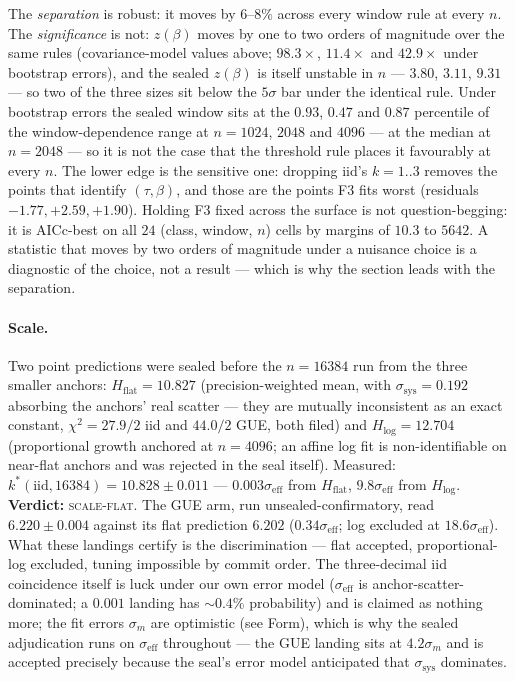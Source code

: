 \documentclass[11pt]{article}
\newcommand{\kstar}{k^{*}}
\newcommand{\seff}{\sigma_{\mathrm{eff}}}
\newcommand{\ssys}{\sigma_{\mathrm{sys}}}
\newcommand{\verdict}[1]{\textsc{#1}}
\begin{document}
\noindent
The \emph{separation} is robust: it moves by $6$--$8\%$ across every window rule at every $n$.
The \emph{significance} is not: $z(\beta)$ moves by one to two orders of magnitude over the
same rules (covariance-model values above; $98.3\times$, $11.4\times$ and $42.9\times$ under
bootstrap errors), and the sealed $z(\beta)$ is itself unstable in $n$ --- $3.80$, $3.11$,
$9.31$ --- so two of the three sizes sit below the $5\sigma$ bar under the identical rule.
Under bootstrap errors the sealed window sits at the $0.93$, $0.47$ and $0.87$ percentile of the
window-dependence range at $n=1024$, $2048$ and $4096$ --- at the median at $n=2048$ --- so it
is not the case that the threshold rule places it favourably at every $n$. The lower edge is
the sensitive one: dropping iid's $k=1..3$ removes the points that identify $(\tau,\beta)$, and
those are the points F3 fits worst (residuals $-1.77,+2.59,+1.90$). Holding F3 fixed across the
surface is not question-begging: it is AICc-best on all $24$ (class, window, $n$) cells by
margins of $10.3$ to $5642$. A statistic that moves by two orders of magnitude under a
nuisance choice is a diagnostic of the choice, not a result --- which is why the section leads
with the separation.

\paragraph{Scale.} Two point predictions were sealed before the $n=16384$ run from the three
smaller anchors: $H_{\mathrm{flat}}=10.827$ (precision-weighted mean, with $\ssys=0.192$
absorbing the anchors' real scatter --- they are mutually inconsistent as an exact constant,
$\chi^2=27.9/2$ iid and $44.0/2$ GUE, both filed) and $H_{\log}=12.704$ (proportional growth
anchored at $n=4096$; an affine log fit is non-identifiable on near-flat anchors and was rejected
in the seal itself). Measured: $\kstar(\text{iid},16384)=10.828\pm0.011$ --- $0.003\seff$ from
$H_{\mathrm{flat}}$, $9.8\seff$ from $H_{\log}$. \textbf{Verdict:} \verdict{scale-flat}. The GUE
arm, run unsealed-confirmatory, read $6.220\pm0.004$ against its flat prediction $6.202$
($0.34\seff$; log excluded at $18.6\seff$). What these landings certify is the discrimination ---
flat accepted, proportional-log excluded, tuning impossible by commit order. The three-decimal
iid coincidence itself is luck under our own error model ($\seff$ is anchor-scatter-dominated; a
$0.001$ landing has ${\sim}0.4\%$ probability) and is claimed as nothing more; the fit errors
$\sigma_m$ are optimistic (see Form), which is why the sealed adjudication runs on $\seff$
throughout --- the GUE landing sits at $4.2\sigma_m$ and is accepted precisely because the seal's
error model anticipated that $\ssys$ dominates.
\end{document}
